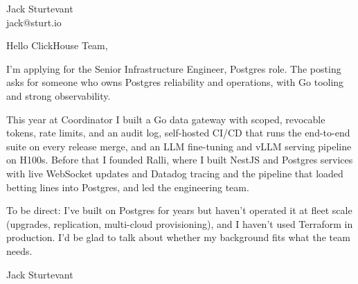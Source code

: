 \documentclass[11pt]{article}
\begin{document}
\raggedright

{\namefont\fontsize{20pt}{24pt}\selectfont Jack Sturtevant}\\[-0.3em]
jack@sturt.io

\vspace{1.2em}

Hello ClickHouse Team,

I'm applying for the Senior Infrastructure Engineer, Postgres role. The posting asks for someone who owns Postgres reliability and operations, with Go tooling and strong observability.

This year at Coordinator I built a Go data gateway with scoped, revocable tokens, rate limits, and an audit log, self-hosted CI/CD that runs the end-to-end suite on every release merge, and an LLM fine-tuning and vLLM serving pipeline on H100s. Before that I founded Ralli, where I built NestJS and Postgres services with live WebSocket updates and Datadog tracing and the pipeline that loaded betting lines into Postgres, and led the engineering team.

To be direct: I've built on Postgres for years but haven't operated it at fleet scale (upgrades, replication, multi-cloud provisioning), and I haven't used Terraform in production. I'd be glad to talk about whether my background fits what the team needs.

\vspace{0.6em}
Jack Sturtevant
\end{document}
